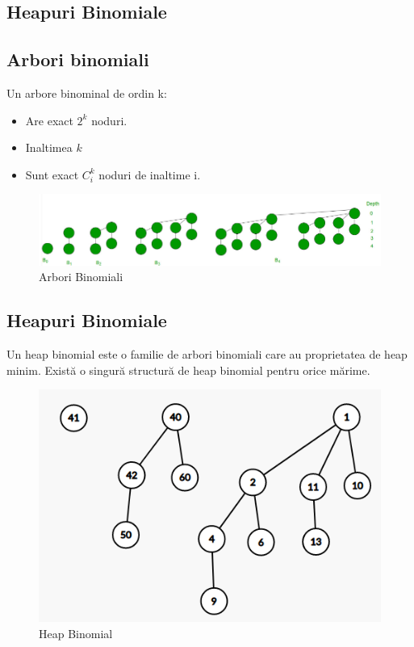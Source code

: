 \documentclass[11pt,a4paper]{article}
\theoremstyle{definition}
\theoremstyle{plain}
\theoremstyle{remark}
\begin{document}
\newpage

\subsection{Heapuri Binomiale}
\subsection*{Arbori binomiali}
Un arbore binominal de ordin k:
\begin{itemize}
    \item Are exact $2^{k}$ noduri.
    \item Inaltimea $k$
    \item Sunt exact $C_{i}^{k}$ noduri de inaltime i.
\end{itemize}
\begin{figure}[H]
    \centering
    \includegraphics[width=0.85\linewidth]{arbori-binomiali.png}
    \caption{Arbori Binomiali}
    \label{fig:enter-label}
\end{figure}

\subsection{Heapuri Binomiale}
Un heap binomial este o familie de arbori binomiali care au proprietatea de heap minim. Există o singură structură de heap binomial pentru orice mărime.

\begin{figure}[H]
    \centering
    \includegraphics[width=0.6\linewidth]{exemplu-heap-binomial.png}
    \caption{Heap Binomial}
    \label{fig:enter-label}
\end{figure}
\end{document}
